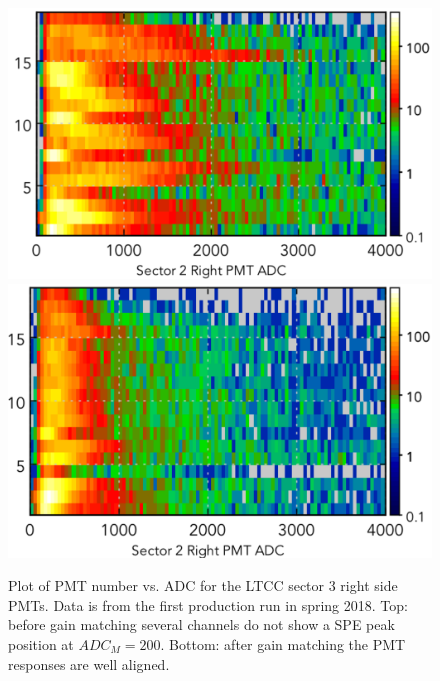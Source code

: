 \begin{figure}[H]
	\centering
	\includegraphics[width=1.05\columnwidth, keepaspectratio]{img/gainMatchingBefore.png}
	\includegraphics[width=1.05\columnwidth, keepaspectratio]{img/gainMatchingAfter.png}
	\caption{Plot of PMT number vs. ADC for the LTCC sector 3 right side PMTs. Data is from the first production
          run in spring 2018. Top: before gain matching several channels do not show a SPE peak position at
          $ADC_M = 200$. Bottom: after gain matching the PMT responses are well aligned.}
	\label{fig:gainMatching}
\end{figure}

